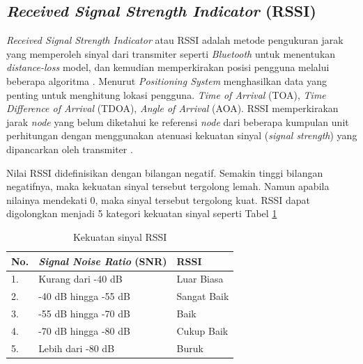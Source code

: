 \subsection{\textit{Received Signal Strength Indicator} (RSSI)}
\textit{Received Signal Strength Indicator} atau RSSI adalah metode pengukuran jarak yang memperoleh sinyal dari transmiter seperti \textit{Bluetooth} untuk menentukan \textit{distance-loss} model, dan kemudian memperkirakan posisi pengguna melalui beberapa algoritma \citep{li2018indoor}. Menurut \citep{puspitasari2020} \textit{Positioning System} menghasilkan data yang penting untuk menghitung lokasi pengguna. \textit{Time of Arrival} (TOA), \textit{Time Difference of Arrival} (TDOA), \textit{Angle of Arrival} (AOA). RSSI memperkirakan jarak \textit{node} yang belum diketahui ke referensi \textit{node} dari beberapa kumpulan unit perhitungan dengan menggunakan atenuasi kekuatan sinyal (\textit{signal strength}) yang dipancarkan oleh transmiter \citep{puspitasari2020}.

\par Nilai RSSI didefinisikan dengan bilangan negatif. Semakin tinggi bilangan negatifnya, maka kekuatan sinyal tersebut tergolong lemah. Namun apabila nilainya mendekati 0, maka sinyal tersebut tergolong kuat. RSSI dapat digolongkan menjadi 5 kategori kekuatan sinyal seperti Tabel \ref{tab:sinyal_rssi}

\begin{table}[H]
\caption{Kekuatan sinyal RSSI \citep{sideeq2016smart}}
\label{tab:sinyal_rssi}
\centering
\begin{tabular}{|l|l|l|}
\hline
{\color[HTML]{000000} \textbf{No.}} & \textit{\textbf{Signal Noise Ratio }}(SNR) & \textbf{RSSI} \\ \hline
1. & Kurang dari -40 dB   & Luar Biasa  \\ \hline
2. & -40 dB hingga -55 dB & Sangat Baik \\ \hline
3. & -55 dB hingga -70 dB & Baik        \\ \hline
4. & -70 dB hingga -80 dB & Cukup Baik  \\ \hline
5. & Lebih dari -80 dB    & Buruk       \\ \hline
\end{tabular}
\end{table}


